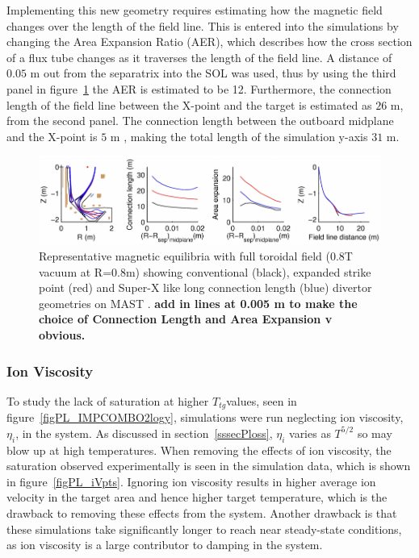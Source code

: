 \documentclass[11pt]{article}  %
\providecommand{\Ttg}{$T_{tg}$} %
\begin{document}
Implementing this new geometry requires estimating how the magnetic field changes over the length of the field line. This is entered into the simulations by changing the Area Expansion Ratio (AER), which describes how the cross section of a flux tube changes as it traverses the length of the field line. A distance of $0.05$ m out from the separatrix into the SOL was used, thus by using the third panel in figure~\ref{figMASTUdesignpapersFig2} the AER is estimated to be 12. Furthermore, the connection length of the field line between the X-point and the target is estimated as $26$ m, from the second panel. The connection length between the outboard midplane and the X-point is $5$ m \cite{Fishpool2013}, making the total length of the simulation y-axis $31$ m.

\begin{figure}
\includegraphics[scale=0.55]{Figures/MASTUdesignpapersFig2.png}
\centering
\caption{Representative magnetic equilibria with full toroidal field (0.8T vacuum at R=0.8m) showing conventional (black), expanded strike point (red) and Super-X like long connection length (blue) divertor geometries on MAST \cite{Fishpool2013}. \textbf{add in lines at 0.005 m to make the choice of Connection Length and Area Expansion v obvious.}}\label{figMASTUdesignpapersFig2}
\end{figure}


\subsubsection{Ion Viscosity}\label{sssecIonviscosity}
To study the lack of saturation at higher \Ttg values, seen in figure~\ref{figPL_IMPCOMBO2logy}, simulations were run neglecting ion viscosity, $\eta_i$, in the system. As discussed in section~\ref{sssecPloss}, $\eta_i$ varies as $T^{5/2}$ so may blow up at high temperatures. When removing the effects of ion viscosity, the saturation observed experimentally is seen in the simulation data, which is shown in figure~\ref{figPL_iVpts}. Ignoring ion viscosity results in higher average ion velocity in the target area and hence higher target temperature, which is the drawback to removing these effects from the system. Another drawback is that these simulations take significantly longer to reach near steady-state conditions, as ion viscosity is a large contributor to damping in the system.
\end{document}
